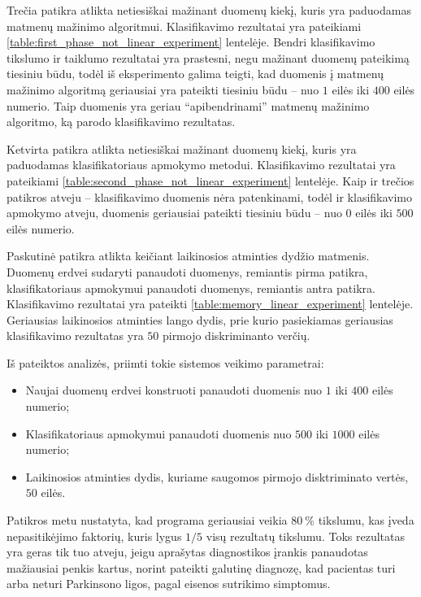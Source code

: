 \documentclass[]{vgtuef}
\begin{document}
Trečia patikra atlikta netiesiškai mažinant duomenų kiekį, kuris yra paduodamas matmenų mažinimo algoritmui. Klasifikavimo rezultatai yra pateikiami \ref{table:first_phase_not_linear_experiment} lentelėje. Bendri klasifikavimo tikslumo ir taiklumo rezultatai yra prastesni, negu mažinant duomenų pateikimą tiesiniu būdu, todėl iš eksperimento galima teigti, kad duomenis į matmenų mažinimo algoritmą geriausiai yra pateikti tiesiniu būdu -- nuo $1$ eilės iki $400$ eilės numerio. Taip duomenis yra geriau ``apibendrinami'' matmenų mažinimo algoritmo, ką parodo klasifikavimo rezultatas.

Ketvirta patikra atlikta netiesiškai mažinant duomenų kiekį, kuris yra paduodamas klasifikatoriaus apmokymo metodui. Klasifikavimo rezultatai yra pateikiami \ref{table:second_phase_not_linear_experiment} lentelėje. Kaip ir trečios patikros atveju -- klasifikavimo duomenis nėra patenkinami, todėl ir klasifikavimo apmokymo atveju, duomenis geriausiai pateikti tiesiniu būdu -- nuo $0$  eilės iki $500$ eilės numerio.

Paskutinė patikra atlikta keičiant laikinosios atminties dydžio matmenis. Duomenų erdvei sudaryti panaudoti duomenys, remiantis pirma patikra, klasifikatoriaus apmokymui panaudoti duomenys, remiantis antra patikra. Klasifikavimo rezultatai yra pateikti \ref{table:memory_linear_experiment} lentelėje. Geriausias laikinosios atminties lango dydis, prie kurio pasiekiamas geriausias klasifikavimo rezultatas yra $50$ pirmojo diskriminanto verčių.

Iš pateiktos analizės, priimti tokie sistemos veikimo parametrai:
\begin{itemize}
\item Naujai duomenų erdvei konstruoti panaudoti duomenis nuo $1$ iki $400$ eilės numerio;
\item Klasifikatoriaus apmokymui panaudoti duomenis nuo $500$ iki $1000$ eilės numerio;
\item Laikinosios atminties dydis, kuriame saugomos pirmojo disktriminato vertės, $50$ eilės.
\end{itemize}

Patikros metu nustatyta, kad programa geriausiai veikia $80~\%$ tikslumu, kas įveda nepasitikėjimo faktorių, kuris lygus $1/5$ visų rezultatų tikslumu. Toks rezultatas yra geras tik tuo atveju, jeigu aprašytas diagnostikos įrankis panaudotas mažiausiai penkis kartus, norint pateikti galutinę diagnozę, kad pacientas turi arba neturi Parkinsono ligos, pagal eisenos sutrikimo simptomus.
\end{document}
